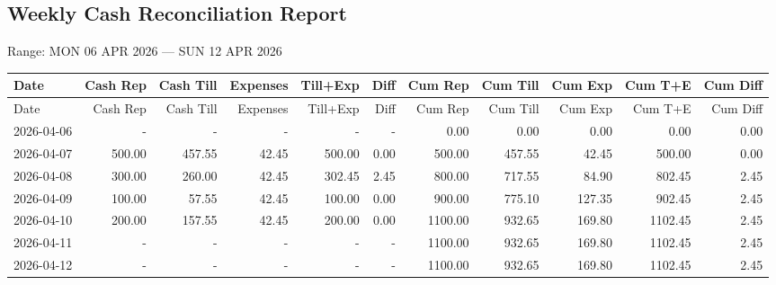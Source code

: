 \documentclass[11pt]{article}
\begin{document}
\begin{landscape}

\section*{Weekly Cash Reconciliation Report}
\noindent
Range: MON 06 APR 2026 --- SUN 12 APR 2026

\bigskip

\footnotesize
\setlength{\LTleft}{0pt}
\setlength{\LTright}{0pt}

\begin{longtable}{p{3.2cm} r r r r r r r r r r}
\toprule
Date & Cash Rep & Cash Till & Expenses & Till+Exp & Diff & Cum Rep & Cum Till & Cum Exp & Cum T+E & Cum Diff \\
\midrule
\endfirsthead

\toprule
Date & Cash Rep & Cash Till & Expenses & Till+Exp & Diff & Cum Rep & Cum Till & Cum Exp & Cum T+E & Cum Diff \\
\midrule
\endhead

\bottomrule
\endfoot

2026-04-06 & - & - & - & - & - & 0.00 & 0.00 & 0.00 & 0.00 & 0.00 \\ \hline
2026-04-07 & 500.00 & 457.55 & 42.45 & 500.00 & 0.00 & 500.00 & 457.55 & 42.45 & 500.00 & 0.00 \\ \hline
2026-04-08 & 300.00 & 260.00 & 42.45 & 302.45 & 2.45 & 800.00 & 717.55 & 84.90 & 802.45 & 2.45 \\ \hline
2026-04-09 & 100.00 & 57.55 & 42.45 & 100.00 & 0.00 & 900.00 & 775.10 & 127.35 & 902.45 & 2.45 \\ \hline
2026-04-10 & 200.00 & 157.55 & 42.45 & 200.00 & 0.00 & 1100.00 & 932.65 & 169.80 & 1102.45 & 2.45 \\ \hline
2026-04-11 & - & - & - & - & - & 1100.00 & 932.65 & 169.80 & 1102.45 & 2.45 \\ \hline
2026-04-12 & - & - & - & - & - & 1100.00 & 932.65 & 169.80 & 1102.45 & 2.45 \\ \hline
\end{longtable}

\end{landscape}
\end{document}
